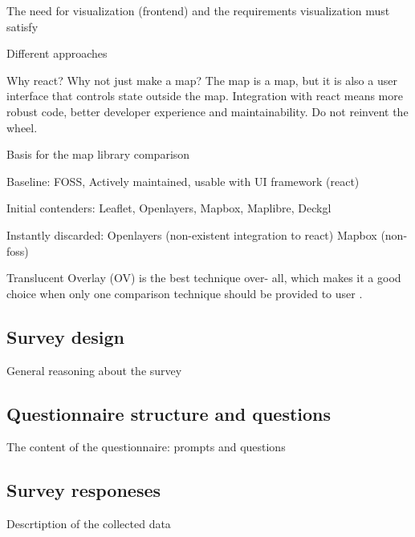 The need for visualization (frontend) and the requirements visualization must satisfy

Different approaches

Why react? Why not just make a map?
The map is a map, but it is also a user interface that controls state outside the map.
Integration with react means more robust code, better developer experience and maintainability.
Do not reinvent the wheel.

Basis for the map library comparison

Baseline: FOSS, Actively maintained, usable with UI framework (react)

Initial contenders: Leaflet, Openlayers, Mapbox, Maplibre, Deckgl

Instantly discarded: Openlayers (non-existent integration to react) Mapbox (non-foss)

Translucent Overlay (OV) is the best technique over-
all, which makes it a good choice when only one comparison
technique should be provided to user \parencite{lob2015}.








\subsection{Survey design}
General reasoning about the survey

\subsection{Questionnaire structure and questions}
The content of the questionnaire: prompts and questions

\subsection{Survey responeses}
Descrtiption of the collected data
